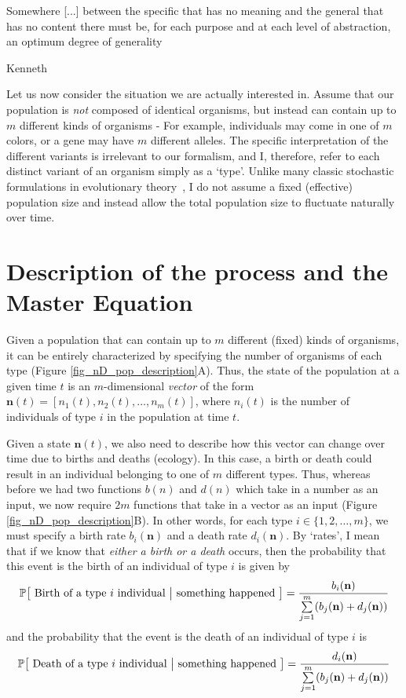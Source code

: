 \epigraph{\justifying Somewhere [...] between the specific that has no meaning and the general that has no content there must be, for each purpose and at each level of abstraction, an optimum degree of generality}{Kenneth~\citet{boulding_general_1956}}

Let us now consider the situation we are actually interested in. Assume that our population is \emph{not} composed of identical organisms, but instead can contain up to $m$ different kinds of organisms - For example, individuals may come in one of $m$ colors, or a gene may have $m$ different alleles. The specific interpretation of the different variants is irrelevant to our formalism, and I, therefore, refer to each distinct variant of an organism simply as a `type'. Unlike many classic stochastic formulations in evolutionary theory~\citep{fisher_genetical_1930,wright_evolution_1931,moran_random_1958, kimura_problems_1957, kimura_diffusion_1964, kimura_number_1964, crow_introduction_1970, lande_natural_1976}, I do not assume a fixed (effective) population size and instead allow the total population size to fluctuate naturally over time. 

\section{Description of the process and the Master Equation}
Given a population that can contain up to $m$ different (fixed) kinds of organisms, it can be entirely characterized by specifying the number of organisms of each type (Figure \ref{fig_nD_pop_description}A). Thus, the state of the population at a given time $t$ is an $m$-dimensional \emph{vector} of the form $\mathbf{n}(t) = [n_1(t),n_2(t),\ldots,n_m(t)]$, where $n_i(t)$ is the number of individuals of type $i$ in the population at time $t$.

Given a state $\mathbf{n}(t)$,  we also need to describe how this vector can change over time due to births and deaths (ecology). In this case, a birth or death could result in an individual belonging to one of $m$ different types. Thus, whereas before we had two functions $b(n)$ and $d(n)$ which take in a number as an input, we now require $2m$ functions that take in a vector as an input (Figure \ref{fig_nD_pop_description}B). In other words, for each type $i \in \{1,2,\ldots,m\}$, we must specify a birth rate $b_i(\mathbf{n})$ and a death rate $d_i(\mathbf{n})$. By `rates', I mean that if we know that \emph{either a birth or a death} occurs, then the probability that this event is the birth of an individual of type $i$ is given by
\begin{equation*}
\mathbb{P}\big[\textrm{ Birth of a type $i$ individual } \big{|} \textrm{ something happened }\big] = \frac{b_i(\mathbf{n})}{\sum\limits_{j=1}^{m}(b_j(\mathbf{n})+d_j(\mathbf{n}))}
\end{equation*}
and the probability that the event is the death of an individual of type $i$ is
\begin{equation*}
\mathbb{P}\big[\textrm{ Death of a type $i$ individual } \big{|} \textrm{ something happened }\big] = \frac{d_i(\mathbf{n})}{\sum\limits_{j=1}^{m}(b_j(\mathbf{n})+d_j(\mathbf{n}))}
\end{equation*}

